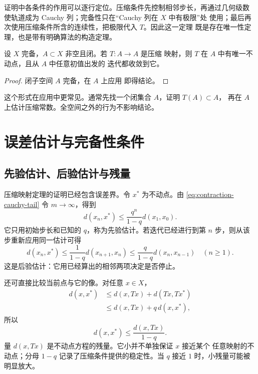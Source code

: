 证明中各条件的作用可以逐行定位。压缩条件先控制相邻步长，再通过几何级数
使轨道成为 Cauchy 列；完备性只在“Cauchy 列在 \(X\) 中有极限”处
使用；最后再次使用压缩条件所含的连续性，把极限代入 \(T\)。因此这一定理
既是存在唯一性定理，也是带有明确算法的构造定理。

\begin{corollary}[闭不变子集上的压缩]
\label{cor:contraction-closed-invariant-subset}
设 \(X\) 完备，\(A\subset X\) 非空且闭。若 \(T:A\to A\) 是压缩
映射，则 \(T\) 在 \(A\) 中有唯一不动点，且从 \(A\) 中任意初值出发的
迭代都收敛到它。
\end{corollary}

\begin{proof}
闭子空间 \(A\) 完备，在 \(A\) 上应用
 即得结论。
\end{proof}

这个形式在应用中更常见。通常先找一个闭集合 \(A\)，证明 \(T(A)\subset A\)，
再在 \(A\) 上估计压缩常数。全空间之外的行为不影响结论。

\section{误差估计与完备性条件}

\subsection{先验估计、后验估计与残量}

压缩映射定理的证明已经包含误差界。令 \(x^\ast\) 为不动点。由
\eqref{eq:contraction-cauchy-tail} 令 \(m\to\infty\)，得到
\begin{equation}
\label{eq:contraction-apriori-error}
 d(x_n,x^\ast)
 \le \frac{q^n}{1-q}d(x_1,x_0).
\end{equation}
它只用初始步长和已知的 \(q\)，称为先验估计。若迭代已经进行到第
\(n\) 步，则从该步重新应用同一估计可得
\begin{equation}
\label{eq:contraction-aposteriori-error}
 d(x_n,x^\ast)
 \le \frac{1}{1-q}d(x_{n+1},x_n)
 \le \frac{q}{1-q}d(x_n,x_{n-1})\quad(n\ge1).
\end{equation}
这是后验估计：它用已经算出的相邻两项决定是否停止。

还可直接比较当前点与它的像。对任意 \(x\in X\)，
\[
\begin{aligned}
 d(x,x^\ast)
 &\le d(x,Tx)+d(Tx,Tx^\ast)\\
 &\le d(x,Tx)+q\,d(x,x^\ast),
\end{aligned}
\]
所以
\begin{equation}
\label{eq:contraction-residual-error}
 d(x,x^\ast)\le\frac{d(x,Tx)}{1-q}.
\end{equation}
量 \(d(x,Tx)\) 是不动点方程的残量。它小并不单独保证 \(x\) 接近某个
任意映射的不动点；分母 \(1-q\) 记录了压缩条件提供的稳定性。当
\(q\) 接近 \(1\) 时，小残量可能被明显放大。

